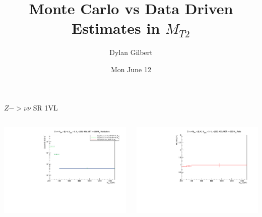 \documentclass{beamer}
\author{Dylan Gilbert}
\title{Monte Carlo vs Data Driven Estimates in $M_{T2}$}
\date{Mon June 12}
\begin{document}
\begin{frame}
\titlepage
\end{frame}

\begin{frame}{$Z->\nu\nu$ SR 1VL}
\begin{columns}
\begin{column}{0.3\textwidth}
\begin{flushleft}\includegraphics[scale=0.2]{PDFs/zinv_estimates_1VL}\end{flushleft}
\end{column}
\begin{column}{0.3\textwidth}
\begin{center}\includegraphics[scale=0.2]{PDFs/zinv_ratio_dy_1VL}\end{center}
\end{column}

\end{columns}
\end{frame}
\end{document}
